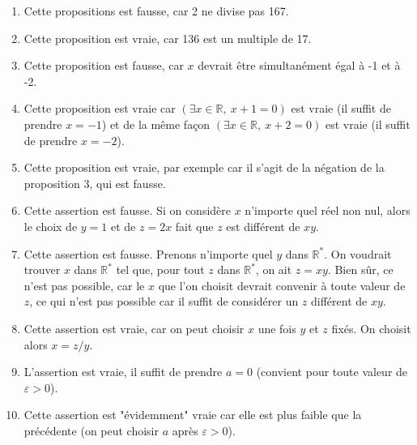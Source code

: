 \documentclass[11pt,a4paper]{article}
\newcommand{\veps}{\varepsilon}\newcommand{\mcu}{\mathcal{U}}
\begin{document}
	\begin{corrige}
		\begin{enumerate}
			
			\item  Cette propositions est fausse, car 2 ne divise pas 167.
			
			\item  Cette proposition est vraie, car 136 est un multiple de 17.
			
			\item  Cette proposition est fausse, car $x$ devrait être simultanément égal à -1 et à -2.
			
			\item  Cette proposition est vraie car $(\exists x\in\mathbb R,\ x+1=0)$ est vraie (il suffit de prendre $x=-1$) et de la même façon $(\exists x\in\mathbb R,\ x+2=0)$ est vraie (il suffit de prendre $x=-2$).
			
			\item  Cette proposition est vraie, par exemple car il s'agit de la négation de la proposition 3, qui est fausse.
			
			\item  Cette assertion est fausse. Si on considère $x$ n'importe quel réel non nul, alors le choix de $y=1$ et de $z=2x$
			fait que $z$ est différent de $xy$.
			
			\item  Cette assertion est fausse. Prenons n'importe quel $y$ dans $\mathbb R^*$. 
			On voudrait trouver $x$ dans $\mathbb R^*$ tel que, pour tout $z$ dans $\mathbb R^*$, on ait $z=xy$. 
			Bien sûr, ce n'est pas possible, car le $x$ que l'on choisit devrait convenir à toute valeur de $z$,
			ce qui n'est pas possible car il suffit de considérer un $z$ différent de $xy$.
			
			\item  Cette assertion est vraie, car on peut choisir $x$ une fois $y$ et $z$ fixés. On choisit alors $x=z/y$.
			
			\item  L'assertion est vraie, il suffit de prendre $a=0$ (convient pour toute valeur de $\veps>0$).
			
			\item  Cette assertion est "évidemment" vraie car elle est plus faible que la précédente (on peut choisir
			$a$ après $\veps>0$).
			
		\end{enumerate}
	\end{corrige}
	
\end{document}
